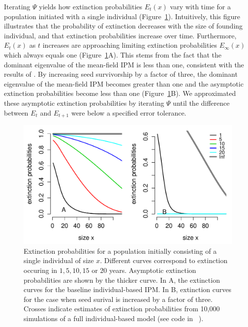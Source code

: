 \documentclass[12pt]{amsart}\usepackage[]{graphicx}\usepackage[]{color}
\makeatletter
\def\maxwidth{ %
  \ifdim\Gin@nat@width>\linewidth
    \linewidth
  \else
    \Gin@nat@width
  \fi
}
\newenvironment{knitrout}{}{} %
\makeatother
\begin{document}
Iterating $\Psi$ yields how extinction probabilities $E_t(x)$ vary with time for a population initiated with a single individual (Figure~\ref{fig:extinction}). Intuitively, this figure illustrates that the probability of extinction decreases with the size of founding individual, and that extinction probabilities increase over time. Furthermore, $E_t(x)$ as $t$ increases are approaching limiting extinction probabilities $E_{\infty}(x)$ which always equals one (Figure~\ref{fig:extinction}A). This stems from the fact that the dominant eigenvalue of the mean-field IPM is less than one, consistent with the results of \citet{salguero-etal-12}. By increasing seed survivorship by a factor of three, the dominant eigenvalue of the mean-field IPM becomes greater than one and the asymptotic extinction probabilities become less than one (Figure~\ref{fig:extinction}B). We approximated these asymptotic extinction probabilities  by iterating $\Psi$ until the difference between $E_t$ and $E_{t+1}$ were below a specified error tolerance.




\begin{knitrout}
\color{fgcolor}\begin{figure}
\includegraphics[width=\maxwidth]{figure/extinction-1} \caption[Extinction probabilities for a population initially consisting of a single individual of size ]{Extinction probabilities for a population initially consisting of a single individual of size $x$. Different curves correspond to extinction occuring in $1, 5, 10, 15$ or $20$ years. Asymptotic extinction probabilities are shown by the thicker curve. In A, the extinction curves for the baseline individual-based IPM. In B, extinction curves for the case when seed surival is increased by a factor of three. Crosses indicate estimates of extinction probabilities from 10,000 simulations of a full individual-based model (see code in ~\citep{schreiber-ross-ibipm-code-2015}).}\label{fig:extinction}
\end{figure}


\end{knitrout}
\end{document}
